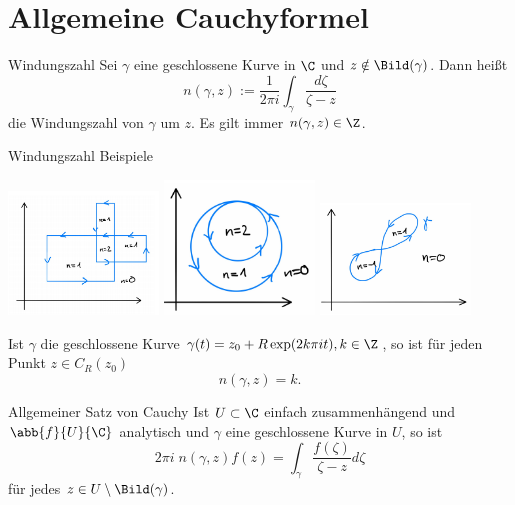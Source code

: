\section{Allgemeine Cauchyformel}

\begin{karte}{Windungszahl}
    Sei \(\gamma\) eine geschlossene Kurve in \(\C\) und \(z \notin \Bild(\gamma)\). 
    Dann heißt 
    \[ n(\gamma, z) := \frac{1}{2\pi i} \int_\gamma \frac{d\zeta}{\zeta - z} \]
    die Windungszahl von \(\gamma\) um \(z\).
    Es gilt immer \( n(\gamma, z) \in \Z \).
\end{karte}

\begin{karte}{Windungszahl Beispiele}
    \begin{center}
        \includegraphics[width=0.3\textwidth]{img/windungszahl-1.png}
        \includegraphics[width=0.3\textwidth]{img/windungszahl-2.png}
        \includegraphics[width=0.3\textwidth]{img/windungszahl-3.png}
    \end{center}
    Ist \(\gamma\) die geschlossene Kurve \(\gamma(t) = z_0 + R \exp(2k \pi i t), k\in \Z\),
    so ist für jeden Punkt \(z\in C_R(z_0)\) 
    \[ n(\gamma, z) = k. \]
\end{karte}

\begin{karte}{Allgemeiner Satz von Cauchy}
    Ist \(U\subset \C\) einfach zusammenhängend und 
    \(\abb{f}{U}{\C}\) analytisch und \(\gamma\) eine 
    geschlossene Kurve in \(U\), so ist 
    \[ 2\pi i \; n(\gamma, z) f(z) = \int_\gamma \frac{f(\zeta)}{\zeta - z} d\zeta \]
    für jedes \(z\in U \setminus \Bild(\gamma)\).
\end{karte}

